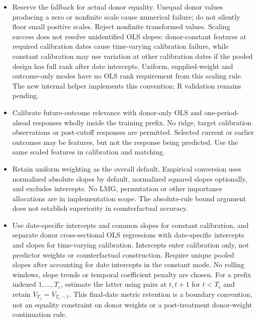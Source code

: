 \documentclass[11pt]{article}
\begin{document}
\begin{itemize}
retaining the donor center and applying divisor 1 to both target and
donors. Preserve any target--donor gap in original feature units rather
than forcing it to zero. This is not unit-variance standardization.
Keep \texttt{none} unchanged and reject nonpositive or nonfinite
\texttt{custom} scales rather than replacing them.
\item Reserve the fallback for actual donor equality. Unequal donor
values producing a zero or nonfinite scale cause numerical failure;
do not silently floor small positive scales. Reject nonfinite transformed
values. Scaling success does not resolve unidentified OLS slopes:
donor-constant features at required calibration dates cause time-varying
calibration failure, while constant calibration may use variation at
other calibration dates if the pooled design has full rank after date
intercepts. Uniform, supplied-weight and outcome-only modes have no OLS
rank requirement from this scaling rule. The new internal helper implements
this convention; R validation remains pending.
\item Calibrate future-outcome relevance with donor-only OLS and
one-period-ahead responses wholly inside the training prefix. No ridge,
target calibration observations or post-cutoff responses are permitted.
Selected current or earlier outcomes may be features, but not the response
being predicted. Use the same scaled features in calibration and matching.
\item Retain uniform weighting as the overall default. Empirical
conversion uses normalized absolute slopes by default, normalized squared
slopes optionally, and excludes intercepts. No LMG, permutation or other
importance allocations are in implementation scope. The absolute-rule
bound argument does not establish superiority in counterfactual accuracy.
\item Use date-specific intercepts and common slopes for constant
calibration, and separate donor cross-sectional OLS regressions with
date-specific intercepts and slopes for time-varying calibration.
Intercepts enter calibration only, not predictor weights or counterfactual
construction. Require unique pooled slopes after accounting for date
intercepts in the constant mode. No rolling
windows, slope trends or temporal coefficient penalty are chosen.
For a prefix indexed $1,\ldots,T_c$, estimate the latter using pairs at
$t,t+1$ for $t<T_c$ and retain $V_{T_c}=V_{T_c-1}$. This final-date metric
retention is a boundary convention, not an equality constraint on donor
weights or a post-treatment donor-weight continuation rule.

\end{itemize}
\end{document}
